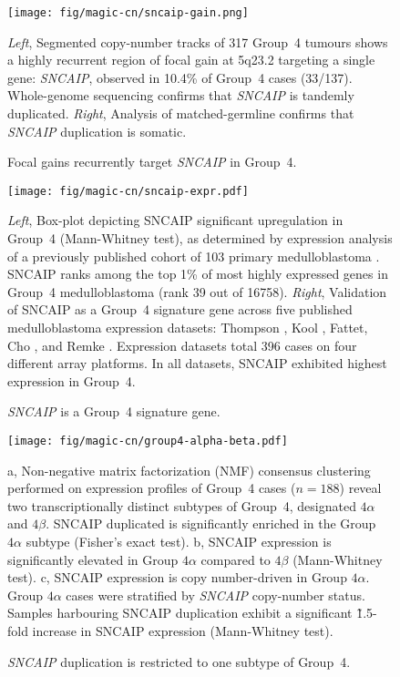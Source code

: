 \documentclass[11pt,letterpaper]{article}
\theoremstyle{definition}
\begin{document}
\begin{figure}[h]
	\begin{center}
		\texttt{[image: fig/magic-cn/sncaip-gain.png]}
	\end{center}
	\caption{Focal gains recurrently target \emph{SNCAIP} in Group~4.}
	\emph{Left}, Segmented copy-number tracks of 317 Group~4 tumours shows a highly recurrent region of focal gain at 5q23.2 targeting a single gene: \emph{SNCAIP}, observed in 10.4\% of Group~4 cases (33/137). Whole-genome sequencing confirms that \emph{SNCAIP} is tandemly duplicated. \emph{Right}, Analysis of matched-germline confirms that \emph{SNCAIP} duplication is somatic.
	\label{fig:sncaip-gain}
\end{figure}

\begin{figure}[h]
	\begin{center}
		\texttt{[image: fig/magic-cn/sncaip-expr.pdf]}
	\end{center}
	\caption{\emph{SNCAIP} is a Group~4 signature gene.}
	\emph{Left}, Box-plot depicting SNCAIP significant upregulation in Group~4 (Mann-Whitney test), as determined by expression analysis of a previously published cohort of 103 primary medulloblastoma . SNCAIP ranks among the top 1\% of most highly expressed genes in Group~4 medulloblastoma (rank 39 out of 16758).
	\emph{Right}, Validation of SNCAIP as a Group~4 signature gene across five published medulloblastoma expression datasets: Thompson , Kool , Fattet, Cho , and Remke . Expression datasets total 396 cases on four different array platforms. In all datasets, SNCAIP exhibited highest expression in Group~4.
	\label{fig:sncaip-expr}
\end{figure}

\begin{figure}[h]
	\begin{center}
		\texttt{[image: fig/magic-cn/group4-alpha-beta.pdf]}
	\end{center}
	\caption{\emph{SNCAIP} duplication is restricted to one subtype of Group~4.}
	\textsf{a}, Non-negative matrix factorization (NMF) consensus clustering performed on expression profiles of Group~4 cases ($n = 188$) reveal two transcriptionally distinct subtypes of Group~4, designated $4\alpha$ and $4\beta$. SNCAIP duplicated is significantly enriched in the Group $4\alpha$ subtype (Fisher's exact test).
	\textsf{b}, SNCAIP expression is significantly elevated in Group $4\alpha$ compared to $4\beta$ (Mann-Whitney test).
	\textsf{c}, SNCAIP expression is copy number-driven in Group $4\alpha$. Group $4\alpha$ cases were stratified by \emph{SNCAIP} copy-number status. Samples harbouring SNCAIP duplication exhibit a significant \~1.5-fold increase in SNCAIP expression (Mann-Whitney test).
	\label{fig:group4-alpha-beta}
\end{figure}
\end{document}
